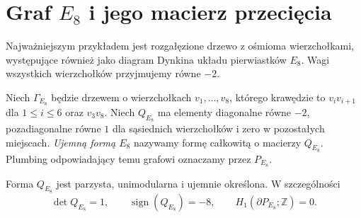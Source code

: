 \section{Graf \texorpdfstring{$E_8$}{E8} i jego macierz przecięcia}
\label{sec:tg-plumbing-E8}

Najważniejszym przykładem jest rozgałęzione drzewo z ośmioma
wierzchołkami, występujące również jako diagram Dynkina
układu pierwiastków $E_8$. Wagi wszystkich wierzchołków
przyjmujemy równe $-2$.

\begin{definicja}
Niech $\Gamma_{E_8}$ będzie drzewem o wierzchołkach
$v_1,\ldots,v_8$, którego krawędzie to
$v_iv_{i+1}$ dla $1\le i\le6$ oraz $v_3v_8$.
Niech $Q_{E_8}$ ma elementy diagonalne równe $-2$,
pozadiagonalne równe $1$ dla sąsiednich wierzchołków
i zero w pozostałych miejscach. \emph{Ujemną formą
$E_8$} nazywamy formę całkowitą o macierzy $Q_{E_8}$.
Plumbing odpowiadający temu grafowi oznaczamy
przez $P_{E_8}$.
\end{definicja}

\begin{center}
\end{center}

\begin{twierdzenie}
\label{thm:tg-E8-unimodular}
Forma $Q_{E_8}$ jest parzysta, unimodularna i ujemnie
określona. W szczególności
\[
\det Q_{E_8}=1,\qquad \operatorname{sign}(Q_{E_8})=-8,
\qquad H_1(\partial P_{E_8};\mathbb Z)=0.
\]
\end{twierdzenie}

